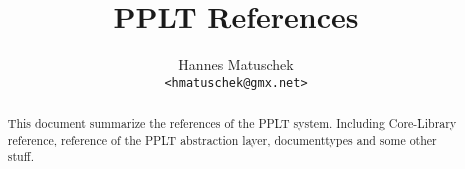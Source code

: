 \documentclass{manual}
\title{PPLT References}
\author{Hannes Matuschek\\\texttt{<hmatuschek@gmx.net>}}
\begin{document}
   
    \maketitle
    \begin{abstract}
    This document summarize the references of the PPLT system. Including Core-Library reference, reference
    of the PPLT abstraction layer, documenttypes and some other stuff.
    \end{abstract}

    \tableofcontents


    
    
    
    
    
    
    
    
    
    
 
\end{document}
